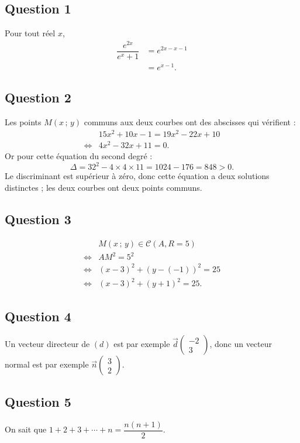 \subsection*{Question 1}
	Pour tout réel \(x\),
	\begin{align*}
		\dfrac{e^{2x}}{e^x+1} &= e^{2x - x - 1} \\
		&= e^{x - 1}.
	\end{align*}
	
	\subsection*{Question 2}
	Les points \(M(x\,;\,y)\) communs aux deux courbes ont des abscisses qui vérifient :
	\begin{align*}
		&15x^2 + 10x - 1 = 19x^2 - 22x + 10 \\
		\iff & 4x^2 - 32x + 11=0.
	\end{align*}
	Or pour cette équation du second degré :
	\[
	\Delta = 32^2 - 4 \times 4 \times 11 = 1024 - 176 = 848 > 0.
	\]
	Le discriminant est supérieur à zéro, donc cette équation a deux solutions distinctes ; les deux courbes ont deux points communs.
	
	\subsection*{Question 3}
	\begin{align*}
		&M(x\,;\,y) \in \mathcal{C}(A, R = 5)\\
		\iff	&AM^2 = 5^2 \\
		\iff&   (x - 3)^2 + (y - (-1))^2 = 25 \\
		\iff&   (x - 3)^2 + (y + 1)^2 = 25.
	\end{align*}
	
	\subsection*{Question 4}
	Un vecteur directeur de \((d)\) est par exemple \(\vec{d}\begin{pmatrix}-2 \\ 3\end{pmatrix}\), donc un vecteur normal est par exemple \(\vec{n}\begin{pmatrix}3 \\ 2\end{pmatrix}.\)
	
	\subsection*{Question 5}
	On sait que \(1 + 2 + 3 + \cdots + n = \dfrac{n(n + 1)}{2}.\)
	
